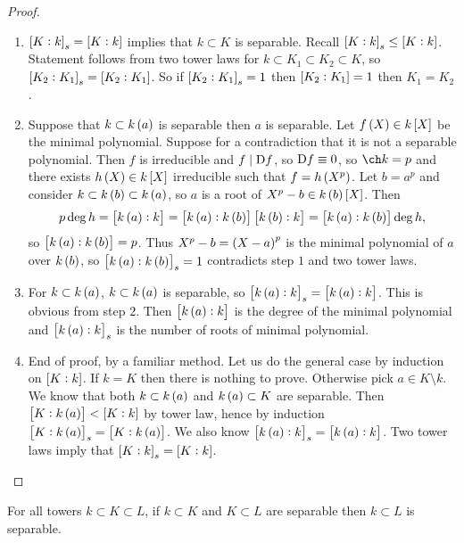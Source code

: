 \begin{proof}
\hfill
\begin{enumerate}[leftmargin=0.5in, label=Step \arabic*.]
\item $ \sbr{K : k}_s = \sbr{K : k} $ implies that $ k \subset K $ is separable. Recall $ \sbr{K : k}_s \le \sbr{K : k} $. Statement follows from two tower laws for $ k \subset K_1 \subset K_2 \subset K $, so $ \sbr{K_2 : K_1}_s = \sbr{K_2 : K_1} $. So if $ \sbr{K_2 : K_1}_s = 1 $ then $ \sbr{K_2 : K_1} = 1 $ then $ K_1 = K_2 $.
\item Suppose that $ k \subset k\br{a} $ is separable then $ a $ is separable. Let $ f\br{X} \in k\sbr{X} $ be the minimal polynomial. Suppose for a contradiction that it is not a separable polynomial. Then $ f $ is irreducible and $ f \mid \mathrm{D} f $, so $ \mathrm{D} f \equiv 0 $, so $ \ch k = p $ and there exists $ h\br{X} \in k\sbr{X} $ irreducible such that $ f = h\br{X^p} $. Let $ b = a^p $ and consider $ k \subset k\br{b} \subset k\br{a} $, so $ a $ is a root of $ X^p - b \in k\br{b}\sbr{X} $. Then
$$ p\deg h = \sbr{k\br{a} : k} = \sbr{k\br{a} : k\br{b}}\sbr{k\br{b} : k} = \sbr{k\br{a} : k\br{b}}\deg h, $$
so $ \sbr{k\br{a} : k\br{b}} = p $. Thus $ X^p - b = \br{X - a}^p $ is the minimal polynomial of $ a $ over $ k\br{b} $, so $ \sbr{k\br{a} : k\br{b}}_s = 1 $ contradicts step $ 1 $ and two tower laws.
\item For $ k \subset k\br{a} $, $ k \subset k\br{a} $ is separable, so $ \sbr{k\br{a} : k}_s = \sbr{k\br{a} : k} $. This is obvious from step $ 2 $. Then $ \sbr{k\br{a} : k} $ is the degree of the minimal polynomial and $ \sbr{k\br{a} : k}_s $ is the number of roots of minimal polynomial.
\item End of proof, by a familiar method. Let us do the general case by induction on $ \sbr{K : k} $. If $ k = K $ then there is nothing to prove. Otherwise pick $ a \in K \setminus k $. We know that both $ k \subset k\br{a} $ and $ k\br{a} \subset K $ are separable. Then $ \sbr{K : k\br{a}} < \sbr{K : k} $ by tower law, hence by induction $ \sbr{K : k\br{a}}_s = \sbr{K : k\br{a}} $. We also know $ \sbr{k\br{a} : k}_s = \sbr{k\br{a} : k} $. Two tower laws imply that $ \sbr{K : k}_s = \sbr{K : k} $.
\end{enumerate}
\end{proof}


\begin{corollary}
For all towers $ k \subset K \subset L $, if $ k \subset K $ and $ K \subset L $ are separable then $ k \subset L $ is separable.
\end{corollary}

